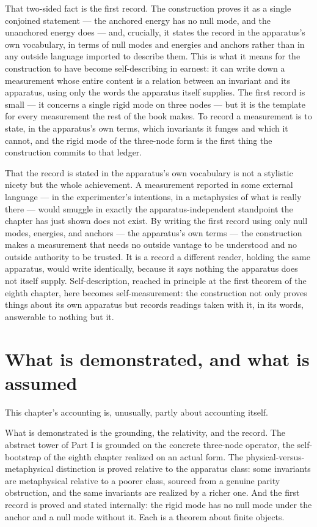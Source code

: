 That two-sided fact is the first record. The construction proves it as a single conjoined statement ---
the anchored energy has no null mode, and the unanchored energy does --- and, crucially, it states the
record in the apparatus's own vocabulary, in terms of null modes and energies and anchors rather than in
any outside language imported to describe them. This is what it means for the construction to have
become self-describing in earnest: it can write down a measurement whose entire content is a relation
between an invariant and its apparatus, using only the words the apparatus itself supplies. The first
record is small --- it concerns a single rigid mode on three nodes --- but it is the template for every
measurement the rest of the book makes. To record a measurement is to state, in the apparatus's own
terms, which invariants it funges and which it cannot, and the rigid mode of the three-node form is the
first thing the construction commits to that ledger.

That the record is stated in the apparatus's own vocabulary is not a stylistic nicety but the whole
achievement. A measurement reported in some external language --- in the experimenter's intentions, in a
metaphysics of what is really there --- would smuggle in exactly the apparatus-independent standpoint the
chapter has just shown does not exist. By writing the first record using only null modes, energies, and
anchors --- the apparatus's own terms --- the construction makes a measurement that needs no outside
vantage to be understood and no outside authority to be trusted. It is a record a different reader,
holding the same apparatus, would write identically, because it says nothing the apparatus does not
itself supply. Self-description, reached in principle at the first theorem of the eighth chapter, here
becomes self-measurement: the construction not only proves things about its own apparatus but records
readings taken with it, in its words, answerable to nothing but it.

\section{What is demonstrated, and what is assumed}
\label{se:demonstrated-assumed-ch17}

This chapter's accounting is, unusually, partly about accounting itself.

What is demonstrated is the grounding, the relativity, and the record. The abstract tower of Part I is
grounded on the concrete three-node operator, the self-bootstrap of the eighth chapter realized on an
actual form. The physical-versus-metaphysical distinction is proved relative to the apparatus class:
some invariants are metaphysical relative to a poorer class, sourced from a genuine parity obstruction,
and the same invariants are realized by a richer one. And the first record is proved and stated
internally: the rigid mode has no null mode under the anchor and a null mode without it. Each is a
theorem about finite objects.

